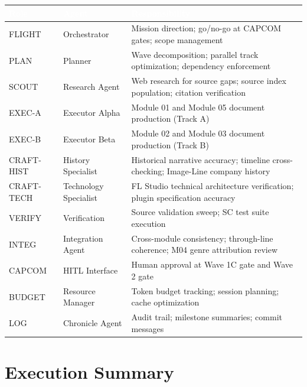 \documentclass[11pt,letterpaper]{article}
\newcommand{\tableheader}[1]{\textbf{\sffamily\textcolor{white}{#1}}}
\begin{document}
\begin{center}
\begin{tabularx}{\textwidth}{L{2cm}L{3cm}X}
\toprule
{}
\tableheader{Role} & \tableheader{Agent} & \tableheader{Responsibility} \\
\midrule
FLIGHT & Orchestrator & Mission direction; go/no-go at CAPCOM gates; scope management \\
PLAN & Planner & Wave decomposition; parallel track optimization; dependency enforcement \\
SCOUT & Research Agent & Web research for source gaps; source index population; citation verification \\
EXEC-A & Executor Alpha & Module 01 and Module 05 document production (Track A) \\
EXEC-B & Executor Beta & Module 02 and Module 03 document production (Track B) \\
CRAFT-HIST & History Specialist & Historical narrative accuracy; timeline cross-checking; Image-Line company history \\
CRAFT-TECH & Technology Specialist & FL Studio technical architecture verification; plugin specification accuracy \\
VERIFY & Verification & Source validation sweep; SC test suite execution \\
INTEG & Integration Agent & Cross-module consistency; through-line coherence; M04 genre attribution review \\
CAPCOM & HITL Interface & Human approval at Wave 1C gate and Wave 2 gate \\
BUDGET & Resource Manager & Token budget tracking; session planning; cache optimization \\
LOG & Chronicle Agent & Audit trail; milestone summaries; commit messages \\
\bottomrule
\end{tabularx}
\end{center}

\section{Execution Summary}
\end{document}
